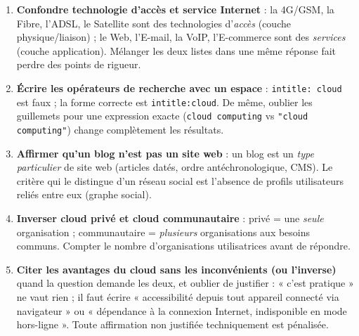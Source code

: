 \documentclass[11pt]{article}
\begin{document}
\begin{attention}
\begin{enumerate}
\item \textbf{Confondre technologie d'accès et service Internet} : la 4G/GSM, la Fibre, l'ADSL, le Satellite sont des technologies d'\emph{accès} (couche physique/liaison) ; le Web, l'E-mail, la VoIP, l'E-commerce sont des \emph{services} (couche application). Mélanger les deux listes dans une même réponse fait perdre des points de rigueur.
\item \textbf{Écrire les opérateurs de recherche avec un espace} : \texttt{intitle: cloud} est faux ; la forme correcte est \texttt{intitle:cloud}. De même, oublier les guillemets pour une expression exacte (\texttt{cloud computing} vs \texttt{"cloud computing"}) change complètement les résultats.
\item \textbf{Affirmer qu'un blog n'est pas un site web} : un blog est un \emph{type particulier} de site web (articles datés, ordre antéchronologique, CMS). Le critère qui le distingue d'un réseau social est l'absence de profils utilisateurs reliés entre eux (graphe social).
\item \textbf{Inverser cloud privé et cloud communautaire} : privé = une \emph{seule} organisation ; communautaire = \emph{plusieurs} organisations aux besoins communs. Compter le nombre d'organisations utilisatrices avant de répondre.
\item \textbf{Citer les avantages du cloud sans les inconvénients (ou l'inverse)} quand la question demande les deux, et oublier de justifier : « c'est pratique » ne vaut rien ; il faut écrire « accessibilité depuis tout appareil connecté via navigateur » ou « dépendance à la connexion Internet, indisponible en mode hors-ligne ». Toute affirmation non justifiée techniquement est pénalisée.
\end{enumerate}
\end{attention}
\end{document}
